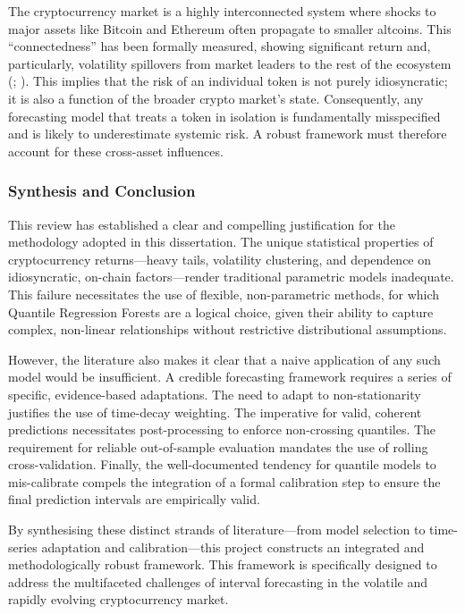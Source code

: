 \documentclass[
  a4paper,
  DIV=11,
  numbers=noendperiod]{scrreprt}
\begin{document}
The cryptocurrency market is a highly interconnected system where shocks
to major assets like Bitcoin and Ethereum often propagate to smaller
altcoins. This ``connectedness'' has been formally measured, showing
significant return and, particularly, volatility spillovers from market
leaders to the rest of the ecosystem (; ). This
implies that the risk of an individual token is not purely
idiosyncratic; it is also a function of the broader crypto market's
state. Consequently, any forecasting model that treats a token in
isolation is fundamentally misspecified and is likely to underestimate
systemic risk. A robust framework must therefore account for these
cross-asset influences.

\subsubsection{Synthesis and Conclusion}\label{synthesis-and-conclusion}

This review has established a clear and compelling justification for the
methodology adopted in this dissertation. The unique statistical
properties of cryptocurrency returns---heavy tails, volatility
clustering, and dependence on idiosyncratic, on-chain factors---render
traditional parametric models inadequate. This failure necessitates the
use of flexible, non-parametric methods, for which Quantile Regression
Forests are a logical choice, given their ability to capture complex,
non-linear relationships without restrictive distributional assumptions.

However, the literature also makes it clear that a naive application of
any such model would be insufficient. A credible forecasting framework
requires a series of specific, evidence-based adaptations. The need to
adapt to non-stationarity justifies the use of time-decay weighting. The
imperative for valid, coherent predictions necessitates post-processing
to enforce non-crossing quantiles. The requirement for reliable
out-of-sample evaluation mandates the use of rolling cross-validation.
Finally, the well-documented tendency for quantile models to
mis-calibrate compels the integration of a formal calibration step to
ensure the final prediction intervals are empirically valid.

By synthesising these distinct strands of literature---from model
selection to time-series adaptation and calibration---this project
constructs an integrated and methodologically robust framework. This
framework is specifically designed to address the multifaceted
challenges of interval forecasting in the volatile and rapidly evolving
cryptocurrency market.
\end{document}

